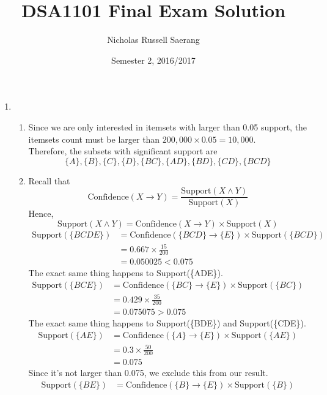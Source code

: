 \documentclass{article}
\title{DSA1101 Final Exam Solution}
\author{Nicholas Russell Saerang}
\date{Semester 2, 2016/2017}
\begin{document}
\maketitle

\begin{enumerate}
    \item 
    \begin{enumerate}
        \item Since we are only interested in itemsets with larger than 0.05 support, the itemsets count must be larger than $200,000\times0.05=10,000$.\\
        Therefore, the subsets with significant support are \[\{A\},\{B\},\{C\},\{D\},\{BC\},\{AD\},\{BD\},\{CD\},\{BCD\}\]
        \item Recall that \[\text{Confidence}(X \rightarrow Y) = \frac{\text{Support}(X \wedge Y)}{\text{Support}(X)}\]
        Hence,
        \[\text{Support}(X \wedge Y)=\text{Confidence}(X \rightarrow Y) \times \text{Support}(X)\]
        \begin{align*}
            \text{Support}(\{BCDE\}) &= \text{Confidence}(\{BCD\} \rightarrow \{E\}) \times \text{Support}(\{BCD\})\\
            &= 0.667 \times \frac{15}{200}\\
            &= 0.050025 < 0.075
        \end{align*}
        The exact same thing happens to Support(\{ADE\}).\\
        \begin{align*}
            \text{Support}(\{BCE\}) &= \text{Confidence}(\{BC\} \rightarrow \{E\}) \times \text{Support}(\{BC\})\\
            &= 0.429 \times \frac{35}{200}\\
            &= 0.075075 > 0.075
        \end{align*}
        The exact same thing happens to Support(\{BDE\}) and Support(\{CDE\}).\\
        \begin{align*}
            \text{Support}(\{AE\}) &= \text{Confidence}(\{A\} \rightarrow \{E\}) \times \text{Support}(\{AE\})\\
            &= 0.3 \times \frac{50}{200}\\
            &= 0.075
        \end{align*}
        Since it's not larger than 0.075, we exclude this from our result.\\
        \begin{align*}
            \text{Support}(\{BE\}) &= \text{Confidence}(\{B\} \rightarrow \{E\}) \times \text{Support}(\{B\})\\

\end{align*}
\end{enumerate}
\end{enumerate}
\end{document}
